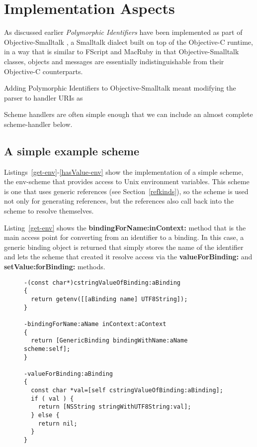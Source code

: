 \documentclass[preprint,authoryear]{llncs}
\begin{document}
\section{Implementation Aspects}
\label{implementation}

As discussed earlier \emph{Polymorphic Identifiers} have been implemented as part of Objective-Smalltalk \cite{objst},
a Smalltalk dialect built on top of the Objective-C\cite{objc-evol}\cite{objc-apple} runtime, 
in a way that is similar to FScript\cite{fscript} and MacRuby \cite{macruby} in that Objective-Smalltalk classes,
objects and messages are essentially indistinguishable from their Objective-C counterparts.

Adding Polymorphic Identifiers to Objective-Smalltalk meant modifying the parser to handler URIs as 

Scheme handlers are often simple enough that we can include an almost complete scheme-handler below.

\subsection{A simple example scheme}

Listings~\ref{get-env}-\ref{hasValue-env} show the implementation of a simple scheme,
the env-scheme that provides access to Unix environment variables.  This scheme is
one that uses generic references (see Section~\ref{refkinds}), so the scheme is used
not only for generating references, but the references also call back into the scheme
to resolve themselves.

Listing~\ref{get-env} 
shows the {\bf bindingForName:inContext:} method that is the main access point for
converting from an identifier to a binding.  In this case, a generic binding object is returned
that simply stores the name of the identifier and lets the scheme that created it resolve
access via the {\bf valueForBinding:} and {\bf setValue:forBinding:} methods.


\begin{figure}[htbp]
\begin{lstlisting}[style=L,label=get-env,caption=Basic lookup in env: scheme.]
-(const char*)cstringValueOfBinding:aBinding
{
  return getenv([[aBinding name] UTF8String]);
}

-bindingForName:aName inContext:aContext
{
  return [GenericBinding bindingWithName:aName scheme:self];
}

-valueForBinding:aBinding
{
  const char *val=[self cstringValueOfBinding:aBinding];
  if ( val ) {
    return [NSString stringWithUTF8String:val];
  } else {
    return nil;
  }
}
\end{lstlisting}
\end{figure}
\end{document}

